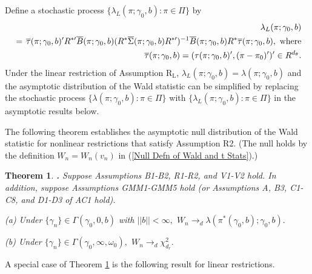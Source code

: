 \documentclass[12pt,thmsb,titlepage,final,oneside,letterpaper]{article}
\newtheorem{theorem}{Theorem}[section]
\begin{document}
Define a stochastic process $\{\lambda _{L}(\pi ;\gamma _{0},b):\pi \in \Pi
\}$ by%
\begin{eqnarray}
&&\hspace{-0.08in}\lambda _{L}(\pi ;\gamma _{0},b)  \notag \\
&=&\hspace{-0.08in}\overline{\tau }(\pi ;\gamma _{0},b)^{\prime }R^{\ast
\prime }\overline{B}(\pi ;\gamma _{0},b)(R^{\ast }\overline{\Sigma }(\pi
;\gamma _{0},b)R^{\ast \prime })^{-1}\overline{B}(\pi ;\gamma _{0},b)R^{\ast
}\overline{\tau }(\pi ;\gamma _{0},b),\text{ where}  \notag \\
&&\hspace{-0.25in}\overline{\tau }(\pi ;\gamma _{0},b)\overset{}{=}(\tau
(\pi ;\gamma _{0},b)^{\prime },(\pi -\pi _{0})^{\prime })^{\prime }\overset{}%
{\in }R^{d_{\theta }}.  \label{Omega Process}
\end{eqnarray}%
Under the linear restriction of Assumption R$_{\text{L}}$, $\lambda _{L}(\pi
;\gamma _{0},b)=\lambda (\pi ;\gamma _{0},b)$ and the asymptotic
distribution of the Wald statistic can be simplified by replacing the
stochastic process $\{\lambda (\pi ;\gamma _{0},b):\pi \in \Pi \}$ with $%
\{\lambda _{L}(\pi ;\gamma _{0},b):\pi \in \Pi \}$ in the asymptotic results
below.

The following theorem establishes the asymptotic null distribution of the
Wald statistic for nonlinear restrictions that satisfy Assumption R2. (The
null holds by the definition $W_{n}=W_{n}(v_{n})$ in (\ref{Null Defn of Wald
and t Stats}).)

\begin{theorem}
\hspace{-0.08in}\textbf{.} \label{Theorem Wald Nonlinear}Suppose Assumptions 
\emph{B1-B2, R1-R2, }and \emph{V1-V2 }hold. In addition, suppose Assumptions 
\emph{GMM1-GMM5 }hold \emph{(}or Assumptions \emph{A, B3, C1-C8, }and \emph{%
D1-D3} of \emph{AC1 }hold\emph{).}

\noindent \emph{(a) }Under $\{\gamma _{n}\}\in \Gamma (\gamma _{0},0,b)$
with $||b||<\infty ,$ $W_{n}\rightarrow _{d}\lambda (\pi ^{\ast }(\gamma
_{0},b);\gamma _{0},b).$

\noindent \emph{(b) }Under $\{\gamma _{n}\}\in \Gamma (\gamma _{0},\infty
,\omega _{0}),$ $W_{n}\rightarrow _{d}\chi _{d_{r}}^{2}.$
\end{theorem}

A special case of Theorem \ref{Theorem Wald Nonlinear} is the following
result for linear restrictions.
\end{document}

